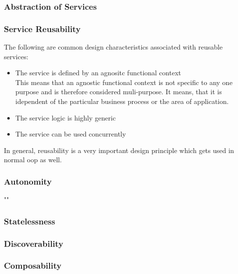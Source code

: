 \documentclass[12pt]{article}
\begin{document}
\subsubsection{Abstraction of Services}
\subsubsection{Service Reusability}
The following are common design characteristics associated with reusable services:
\begin{itemize}
\item The service is defined by an agnositc functional context \\
	This means that an agnostic functional context is not specific to any one purpose and is therefore considered muli-purpose. It means, that it is idependent of the particular business process or the area of application.
\item The service logic is highly generic %
\item The service can be used concurrently
\end{itemize}
In general, reusability is a very important design principle %
which gets used in normal \gls{oop} as well. \cite[page 140-150]{grau}
\subsubsection{Autonomity}
""
\subsubsection{Statelessness}
\subsubsection{Discoverability}
\subsubsection{Composability}
\end{document}
